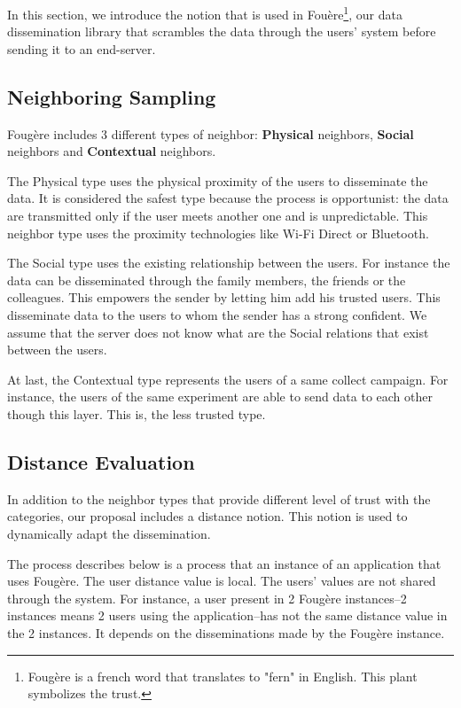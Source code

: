 

In this section, we introduce the notion that is used in Fou\`ere\footnote{Foug\`ere is a french word that translates to "fern" in English. This plant symbolizes the trust.}, our data dissemination library that scrambles the data through the users' system before sending it to an end-server.

\subsection{Neighboring Sampling}

Foug\`ere includes 3 different types of neighbor: \textbf{Physical} neighbors, \textbf{Social} neighbors and \textbf{Contextual} neighbors.

The Physical type uses the physical proximity of the users to disseminate the data.
It is considered the safest type because the process is opportunist: the data are transmitted only if the user meets another one and is unpredictable.
This neighbor type uses the proximity technologies like Wi-Fi Direct or Bluetooth.

The Social type uses the existing relationship between the users.
For instance the data can be disseminated through the family members, the friends or the colleagues.
This empowers the sender by letting him add his trusted users.
This disseminate data to the users to whom the sender has a strong confident.
We assume that the server does not know what are the Social relations that exist between the users.

At last, the Contextual type represents the users of a same collect campaign.
For instance, the users of the same experiment are able to send data to each other though this layer. 
This is, the less trusted type.

\subsection{Distance Evaluation}

In addition to the neighbor types that provide different level of trust with the categories, our proposal includes a distance notion.
This notion is used to dynamically adapt the dissemination.

The process describes below is a process that an instance of an application that uses Foug\`ere.
The user distance value is local.
The users' values are not shared through the system.
For instance, a user present in 2 Foug\`ere instances--2 instances means 2 users using the application--has not the same distance value in the 2 instances.
It depends on the disseminations made by the Foug\`ere instance.

